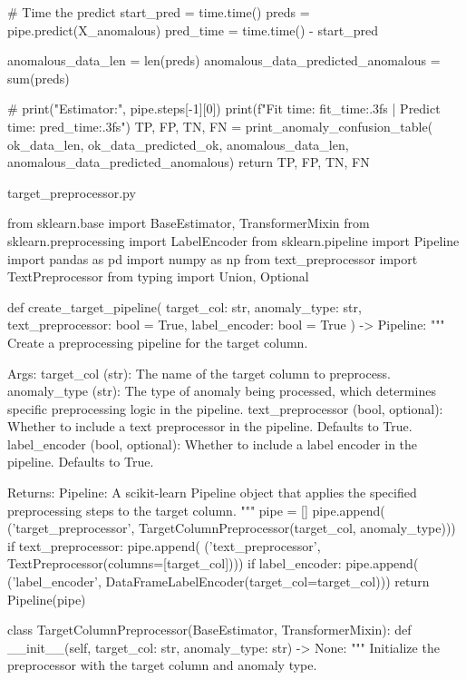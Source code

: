 {{        # Time the predict
    start_pred = time.time()
    preds = pipe.predict(X_anomalous)
    pred_time = time.time() - start_pred

    anomalous_data_len = len(preds)
    anomalous_data_predicted_anomalous = sum(preds)

    # print("Estimator:", pipe.steps[-1][0])
    print(f"Fit time: {fit_time:.3f}s | Predict time: {pred_time:.3f}s")
    TP, FP, TN, FN = print_anomaly_confusion_table(
        ok_data_len, ok_data_predicted_ok, anomalous_data_len, anomalous_data_predicted_anomalous)
    return TP, FP, TN, FN

\endtt

\sec target_preprocessor.py

\begtt {}
from sklearn.base import BaseEstimator, TransformerMixin
from sklearn.preprocessing import LabelEncoder
from sklearn.pipeline import Pipeline
import pandas as pd
import numpy as np
from text_preprocessor import TextPreprocessor
from typing import Union, Optional


def create_target_pipeline(
    target_col: str,
    anomaly_type: str,
    text_preprocessor: bool = True,
    label_encoder: bool = True
) -> Pipeline:
    """
    Create a preprocessing pipeline for the target column.

    Args:
        target_col (str): The name of the target column to preprocess.
        anomaly_type (str): The type of anomaly being processed, which determines 
                            specific preprocessing logic in the pipeline.
        text_preprocessor (bool, optional): Whether to include a text preprocessor 
                                            in the pipeline. Defaults to True.
        label_encoder (bool, optional): Whether to include a label encoder in the 
                                        pipeline. Defaults to True.

    Returns:
        Pipeline: A scikit-learn Pipeline object that applies the specified 
                  preprocessing steps to the target column.
    """
    pipe = []
    pipe.append(
        ('target_preprocessor', TargetColumnPreprocessor(target_col, anomaly_type)))
    if text_preprocessor:
        pipe.append(
            ('text_preprocessor', TextPreprocessor(columns=[target_col])))
    if label_encoder:
        pipe.append(
            ('label_encoder', DataFrameLabelEncoder(target_col=target_col)))
    return Pipeline(pipe)


class TargetColumnPreprocessor(BaseEstimator, TransformerMixin):
    def __init__(self, target_col: str, anomaly_type: str) -> None:
        """
        Initialize the preprocessor with the target column and anomaly type.

}}
